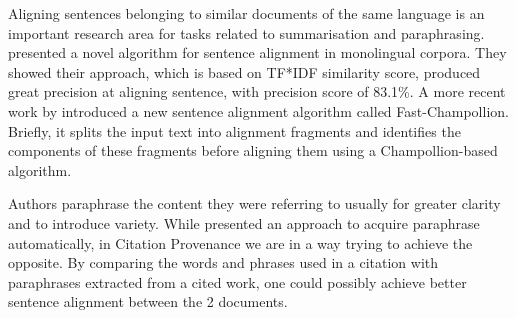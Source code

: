 Aligning sentences belonging to similar documents of the same language is an important research area for tasks related to summarisation and paraphrasing.  presented a novel algorithm for sentence alignment in monolingual corpora. They showed their approach, which is based on TF*IDF similarity score, produced great precision at aligning sentence, with precision score of 83.1\%. A more recent work by  introduced a new sentence alignment algorithm called Fast-Champollion. Briefly, it splits the input text into alignment fragments and identifies the components of these fragments before aligning them using a Champollion-based algorithm.

Authors paraphrase the content they were referring to usually for greater clarity and to introduce variety. While  presented an approach to acquire paraphrase automatically, in Citation Provenance we are in a way trying to achieve the opposite. By comparing the words and phrases used in a citation with paraphrases extracted from a cited work, one could possibly achieve better sentence alignment between the 2 documents.